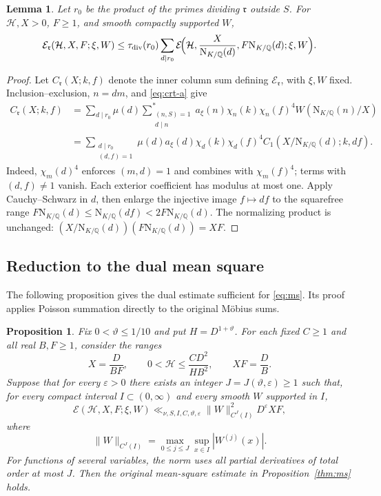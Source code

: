 \documentclass[11pt,a4paper]{article}
\numberwithin{equation}{section}
\numberwithin{figure}{section}
\newtheorem{proposition}[theorem]{Proposition}
\newtheorem{lemma}[theorem]{Lemma}
\theoremstyle{definition}
\theoremstyle{remark}
\newcommand{\Q}{\mathbb Q}
\newcommand{\NK}{\mathrm N_{K/\Q}}
\newcommand{\E}{\mathcal E}
\begin{document}
\begin{lemma}\label{lem:remove-exclusions}
Let $r_0$ be the product of the primes dividing $\mathfrak r$ outside
$S$. For $\mathcal H,X>0$, $F\ge1$, and smooth compactly supported $W$,
\begin{equation}\label{eq:remove-exclusions}
 \E_{\mathfrak r}(\mathcal H,X,F;\xi,W)
 \le\tau_{\mathrm{div}}(r_0)
 \sum_{d\mid r_0}\E\!\Bigl(\mathcal H,\frac X{\NK(d)},F\NK(d);\xi,W\Bigr).
\end{equation}
\end{lemma}
\begin{proof}
Let $C_{\mathfrak r}(X;k,f)$ denote the inner column sum defining
$\E_{\mathfrak r}$, with $\xi,W$ fixed. Inclusion--exclusion,
$n=dm$, and \eqref{eq:crt-a} give
\[
 \begin{aligned}
 C_{\mathfrak r}(X;k,f)
 &=\sum_{d\mid r_0}\mu(d)
   \sum_{\substack{(n,S)=1\\d\mid n}}^*
   a_\xi(n)\chi_n(k)\chi_n(f)^4W(\NK(n)/X)\\
 &=\sum_{\substack{d\mid r_0\\(d,f)=1}}
   \mu(d)a_\xi(d)\chi_d(k)\chi_d(f)^4
   C_1(X/\NK(d);k,df).
 \end{aligned}
\]
Indeed, $\chi_m(d)^4$ enforces $(m,d)=1$ and combines with
$\chi_m(f)^4$; terms with $(d,f)\ne1$ vanish. Each exterior
coefficient has modulus at most one. Apply Cauchy--Schwarz in $d$,
then enlarge the injective image $f\mapsto df$ to the squarefree
range $F\NK(d)\le\NK(df)<2F\NK(d)$. The normalizing product is
unchanged: $(X/\NK(d))(F\NK(d))=XF$.
\end{proof}


\subsection{Reduction to the dual mean square}
The following proposition gives the dual estimate sufficient for
\eqref{eq:ms}. Its proof applies Poisson summation directly to the
original M\"obius sums.

\begin{proposition}\label{prop:poisson-reduction}
Fix $0<\vartheta\le1/10$ and put $H=D^{1+\vartheta}$.
For each fixed $C\ge1$ and all real $B,F\ge1$, consider the ranges
\begin{equation}\label{eq:initial-scales}
 X=\frac D{BF},\qquad 0<\mathcal{H}\le\frac{CD^2}{HB^2},\qquad
 XF=\frac DB.
\end{equation}
Suppose that for every $\varepsilon>0$ there exists an integer
$J=J(\vartheta,\varepsilon)\ge1$ such that, for every compact interval
$I\subset(0,\infty)$ and every smooth $W$ supported in $I$,
\begin{equation}\label{eq:auxiliary-target}
 \E(\mathcal H,X,F;\xi,W)
 \ll_{\nu,S,I,C,\vartheta,\varepsilon}\|W\|_{C^J(I)}^2D^\varepsilon XF,
\end{equation}
where
\[
 \|W\|_{C^J(I)}=\max_{0\le j\le J}\sup_{x\in I}|W^{(j)}(x)|.
\]
For functions of several variables, the norm uses all partial derivatives
of total order at most $J$.
Then the original mean-square
estimate in Proposition~\ref{thm:ms} holds.
\end{proposition}
\end{document}
